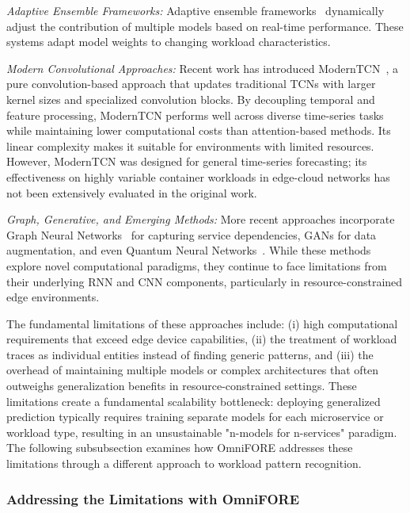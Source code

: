 \textit{Adaptive Ensemble Frameworks:} Adaptive ensemble frameworks~\cite{kim2024ensemble} dynamically adjust the contribution of multiple models based on real-time performance. These systems adapt model weights to changing workload characteristics.

\textit{Modern Convolutional Approaches:} Recent work has introduced ModernTCN~\cite{ModernTCN}, a pure convolution-based approach that updates traditional \acp{TCN} with larger kernel sizes and specialized convolution blocks. By decoupling temporal and feature processing, ModernTCN performs well across diverse time-series tasks while maintaining lower computational costs than attention-based methods. Its linear complexity makes it suitable for environments with limited resources. However, ModernTCN was designed for general time-series forecasting; its effectiveness on highly variable container workloads in edge-cloud networks has not been extensively evaluated in the original work.

\textit{Graph, Generative, and Emerging Methods:} More recent approaches incorporate Graph Neural Networks~\cite{li2024evogwp} for capturing service dependencies, \acp{GAN} \cite{esteban2017real} for data augmentation, and even Quantum Neural Networks~\cite{10531701}. While these methods explore novel computational paradigms, they continue to face limitations from their underlying \ac{RNN} and \ac{CNN} components, particularly in resource-constrained edge environments.

The fundamental limitations of these approaches include: (i) high computational requirements that exceed edge device capabilities, (ii) the treatment of workload traces as individual entities instead of finding generic patterns, and (iii) the overhead of maintaining multiple models or complex architectures that often outweighs generalization benefits in resource-constrained settings. These limitations create a fundamental scalability bottleneck: deploying generalized prediction typically requires training separate models for each microservice or workload type, resulting in an unsustainable "n-models for n-services" paradigm. The following subsubsection examines how \ac{OmniFORE} addresses these limitations through a different approach to workload pattern recognition.

\subsubsection{Addressing the Limitations with OmniFORE}

